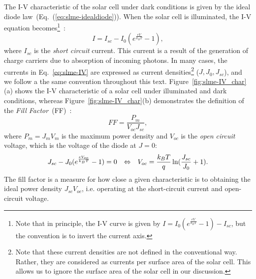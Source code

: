 \begin{refsection}
The I-V characteristic of the solar cell under dark conditions is given by the ideal diode law~(Eq.~(\ref{eq:slme-idealdiode})). When the solar cell is illuminated, the I-V equation becomes\footnote{Note that in principle, the I-V curve is given by $I = I_0 (e^\frac{e V}{k_B T} - 1) - I_{sc}$, but the convention is to invert the current axis.}~\cite{Lindholm1979}:
\begin{equation}\label{eq:slme-V}
I = I_{sc} - I_0 (e^\frac{e V}{k_B T} - 1),
\end{equation}
where $I_{sc}$ is the \textit{short circuit} current. This current is a result of the generation of charge carriers due to absorption of incoming photons. In many cases, the currents in Eq.~\ref{eq:slme-IV} are expressed as current densities\footnote{Note that these current densities are not defined in the conventional way. Rather, they are considered as currents per surface area of the solar cell. This allows us to ignore the surface area of the solar cell in our discussion.} ($J,J_0,J_{sc}$), and we follow a the same convention throughout this text. Figure~\ref{fig:slme-IV_char}(a) shows the I-V characteristic of a solar cell under illuminated and dark conditions, whereas Figure~\ref{fig:slme-IV_char}(b) demonstrates the definition of the \textit{Fill Factor}~(FF)~\cite{Fonash2010}:
\begin{equation}
FF = \frac{P_{m}}{V_{oc} J_{sc}},
\end{equation}
where $P_m = J_m V_m$ is the maximum power density and $V_{oc}$ is the \textit{open circuit} voltage, which is the voltage of the diode at $J = 0$:
\begin{equation}
J_{sc} - J_0 (e^\frac{eV_{oc}}{k_B T}-1) = 0 \hspace{0.1in} \Leftrightarrow \hspace{0.1in} V_{oc} = \frac{k_B T}{q} \ln (\frac{J_{sc}}{J_0} + 1).
\end{equation}
The fill factor is a measure for how close a given characteristic is to obtaining the ideal power density $J_{sc}V_{oc}$, i.e. operating at the short-circuit current and open-circuit voltage.


\end{refsection}
